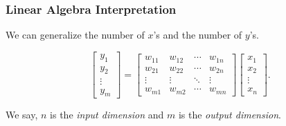 \documentclass{beamer}
\begin{document}
\begin{frame}
  \frametitle{Linear Algebra Interpretation}
  We can generalize the number of \(x\)'s and the number of \(y\)'s.

  \[
    \begin{bmatrix}
      y_1 \\ y_2 \\ \vdots \\ y_m
    \end{bmatrix}
    =
    \begin{bmatrix}
      w_{11} & w_{12} & \cdots & w_{1n} \\
      w_{21} & w_{22} & \cdots & w_{2n} \\
      \vdots & \vdots & \ddots & \vdots \\
      w_{m1} & w_{m2} & \cdots & w_{mn}
    \end{bmatrix}
    \begin{bmatrix}
      x_1 \\ x_2 \\ \vdots \\ x_n
    \end{bmatrix}.
  \]

  We say, \(n\) is the \emph{input dimension} and \(m\) is the \emph{output dimension}.
\end{frame}
\end{document}
